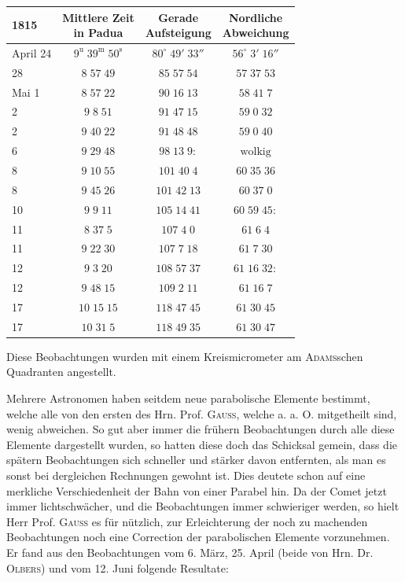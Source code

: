 \begin{center}\fontsize{10}{12}\selectfont\setlength{\tabcolsep}{5pt}\renewcommand{\arraystretch}{1.15}\begin{tabular}{l|c|c|c}
1815 & \shortstack{Mittlere Zeit\\in Padua} & \shortstack{Gerade\\Aufsteigung} & \shortstack{Nordliche\\Abweichung}\\\hline
April 24 & $9^{\mathrm u}\;39^{\mathrm m}\;50^{\mathrm s}$ & $80^\circ\;49'\;33''$ & $56^\circ\;3'\;16''$\\
28 & $8\;57\;49$ & $85\;57\;54$ & $57\;37\;53$\\
Mai 1 & $8\;57\;22$ & $90\;16\;13$ & $58\;41\;7$\\
2 & $9\;8\;51$ & $91\;47\;15$ & $59\;0\;32$\\
2 & $9\;40\;22$ & $91\;48\;48$ & $59\;0\;40$\\
6 & $9\;29\;48$ & $98\;13\;9:$ & $\text{wolkig}$\\
8 & $9\;10\;55$ & $101\;40\;4$ & $60\;35\;36$\\
8 & $9\;45\;26$ & $101\;42\;13$ & $60\;37\;0$\\
10 & $9\;9\;11$ & $105\;14\;41$ & $60\;59\;45:$\\
11 & $8\;37\;5$ & $107\;4\;0$ & $61\;6\;4$\\
11 & $9\;22\;30$ & $107\;7\;18$ & $61\;7\;30$\\
12 & $9\;3\;20$ & $108\;57\;37$ & $61\;16\;32:$\\
12 & $9\;48\;15$ & $109\;2\;11$ & $61\;16\;7$\\
17 & $10\;15\;15$ & $118\;47\;45$ & $61\;30\;45$\\
17 & $10\;31\;5$ & $118\;49\;35$ & $61\;30\;47$\\
\end{tabular}\end{center}

\par\indent Diese Beobachtungen wurden mit einem Kreismicrometer am \textsc{Adams}schen Quadranten angestellt.

\par\indent Mehrere Astronomen haben seitdem neue parabolische Elemente bestimmt, welche alle von den
ersten des Hrn. Prof. \textsc{Gauss}, welche a. a. O. mitgetheilt sind, wenig abweichen. So gut aber immer
die frühern Beobachtungen durch alle diese Elemente dargestellt wurden, so hatten diese doch das
Schicksal gemein, dass die spätern Beobachtungen sich schneller und stärker davon entfernten, als
man es sonst bei dergleichen Rechnungen gewohnt ist. Dies deutete schon auf eine merkliche
Verschiedenheit der Bahn von einer Parabel hin. Da der Comet jetzt immer lichtschwächer, und die
Beobachtungen immer schwieriger werden, so hielt Herr Prof. \textsc{Gauss} es für nützlich, zur
Erleichterung der noch zu machenden Beobachtungen noch eine Correction der parabolischen Elemente
vorzunehmen. Er fand aus den Beobachtungen vom 6. März, 25. April (beide von Hrn. Dr. \textsc{Olbers}) und
vom 12. Juni folgende Resultate:

